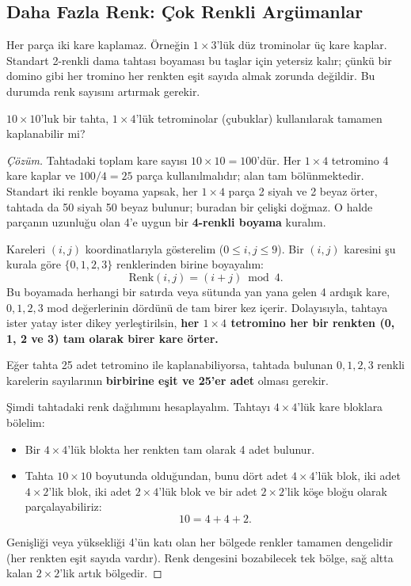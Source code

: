 \subsection{Daha Fazla Renk: Çok Renkli Argümanlar}

Her parça iki kare kaplamaz. Örneğin $1 \times 3$'lük düz trominolar üç kare kaplar. Standart 2-renkli dama tahtası boyaması bu taşlar için yetersiz kalır; çünkü bir domino gibi her tromino her renkten eşit sayıda almak zorunda değildir. Bu durumda renk sayısını artırmak gerekir.

\begin{example}
$10 \times 10$'luk bir tahta, $1 \times 4$'lük tetrominolar (çubuklar) kullanılarak tamamen kaplanabilir mi?
\end{example}

\begin{proof}[Çözüm]
Tahtadaki toplam kare sayısı $10 \times 10 = 100$'dür. Her $1 \times 4$ tetromino 4 kare kaplar ve $100 / 4 = 25$ parça kullanılmalıdır; alan tam bölünmektedir. Standart iki renkle boyama yapsak, her $1 \times 4$ parça 2 siyah ve 2 beyaz örter, tahtada da 50 siyah 50 beyaz bulunur; buradan bir çelişki doğmaz. O halde parçanın uzunluğu olan 4'e uygun bir \textbf{4-renkli boyama} kuralım.

Kareleri $(i, j)$ koordinatlarıyla gösterelim ($0 \le i, j \le 9$). Bir $(i, j)$ karesini şu kurala göre $\{0, 1, 2, 3\}$ renklerinden birine boyayalım:
\[
\text{Renk}(i, j) = (i + j) \bmod 4.
\]
Bu boyamada herhangi bir satırda veya sütunda yan yana gelen 4 ardışık kare, $0, 1, 2, 3$ mod değerlerinin dördünü de tam birer kez içerir.
Dolayısıyla, tahtaya ister yatay ister dikey yerleştirilsin, \textbf{her $1 \times 4$ tetromino her bir renkten (0, 1, 2 ve 3) tam olarak birer kare örter.}

Eğer tahta 25 adet tetromino ile kaplanabiliyorsa, tahtada bulunan $0, 1, 2, 3$ renkli karelerin sayılarının \textbf{birbirine eşit ve 25'er adet} olması gerekir.

Şimdi tahtadaki renk dağılımını hesaplayalım. Tahtayı $4 \times 4$'lük kare bloklara bölelim:
\begin{itemize}
    \item Bir $4 \times 4$'lük blokta her renkten tam olarak 4 adet bulunur.
    \item Tahta $10 \times 10$ boyutunda olduğundan, bunu dört adet $4 \times 4$'lük blok, iki adet $4 \times 2$'lik blok, iki adet $2 \times 4$'lük blok ve bir adet $2 \times 2$'lik köşe bloğu olarak parçalayabiliriz:
    \[
    10 = 4 + 4 + 2.
    \]
\end{itemize}
Genişliği veya yüksekliği 4'ün katı olan her bölgede renkler tamamen dengelidir (her renkten eşit sayıda vardır). Renk dengesini bozabilecek tek bölge, sağ altta kalan $2 \times 2$'lik artık bölgedir.


\end{proof}
